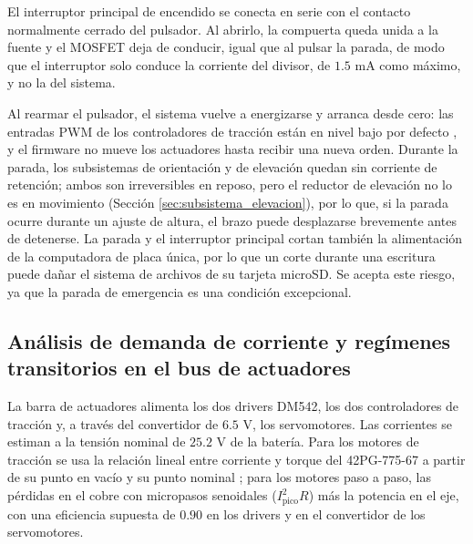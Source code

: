 \documentclass[../../General.tex]{subfiles}
\begin{document}
El interruptor principal de encendido se conecta en serie con el contacto normalmente cerrado del pulsador. Al abrirlo, la compuerta queda unida a la fuente y el MOSFET deja de conducir, igual que al pulsar la parada, de modo que el interruptor solo conduce la corriente del divisor, de $1.5\text{ mA}$ como máximo, y no la del sistema.

Al rearmar el pulsador, el sistema vuelve a energizarse y arranca desde cero: las entradas PWM de los controladores de tracción están en nivel bajo por defecto \citep{pololu_h2_36v11}, y el firmware no mueve los actuadores hasta recibir una nueva orden. Durante la parada, los subsistemas de orientación y de elevación quedan sin corriente de retención; ambos son irreversibles en reposo, pero el reductor de elevación no lo es en movimiento (Sección \ref{sec:subsistema_elevacion}), por lo que, si la parada ocurre durante un ajuste de altura, el brazo puede desplazarse brevemente antes de detenerse.
La parada y el interruptor principal cortan también la alimentación de la computadora de placa única, por lo que un corte durante una escritura puede dañar el sistema de archivos de su tarjeta microSD. Se acepta este riesgo, ya que la parada de emergencia es una condición excepcional.

\subsection{Análisis de demanda de corriente y regímenes transitorios en el bus de actuadores}\label{subsec:demanda_corriente}

La barra de actuadores alimenta los dos drivers DM542, los dos controladores de tracción y, a través del convertidor de $6.5\text{ V}$, los servomotores. Las corrientes se estiman a la tensión nominal de $25.2\text{ V}$ de la batería. Para los motores de tracción se usa la relación lineal entre corriente y torque del 42PG-775-67 a partir de su punto en vacío y su punto nominal \citep{motor_42pg775}; para los motores paso a paso, las pérdidas en el cobre con micropasos senoidales ($I_{\text{pico}}^2 R$) más la potencia en el eje, con una eficiencia supuesta de $0.90$ en los drivers y en el convertidor de los servomotores.
\end{document}
